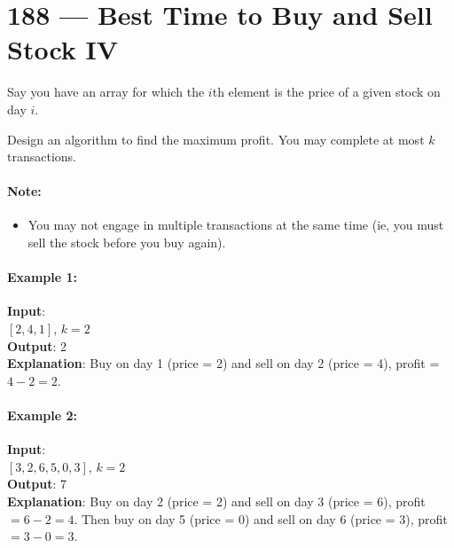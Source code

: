 \section{188 --- Best Time to Buy and Sell Stock IV}
Say you have an array for which the $i$th element is the price of a given stock on day $i$.
\par
Design an algorithm to find the maximum profit. You may complete at most $k$ transactions.
\paragraph{Note:}
\begin{itemize}
\item You may not engage in multiple transactions at the same time (ie, you must sell the stock before you buy again).
\end{itemize}
\paragraph{Example 1:}
\begin{flushleft}
\textbf{Input}: 
\\
$[2,4,1]$, $k = 2$
\\
\textbf{Output}: 2
\\
\textbf{Explanation}: Buy on day 1 (price = 2) and sell on day 2 (price = 4), profit = $4-2 = 2$.
\end{flushleft}
\paragraph{Example 2:}
\begin{flushleft}
\textbf{Input}:
\\
$[3,2,6,5,0,3]$, $k = 2$
\\
\textbf{Output}: 7
\\
\textbf{Explanation}: Buy on day 2 (price = 2) and sell on day 3 (price = 6), profit $= 6-2 = 4$. Then buy on day 5 (price = 0) and sell on day 6 (price = 3), profit $= 3-0 = 3$.
\end{flushleft}
